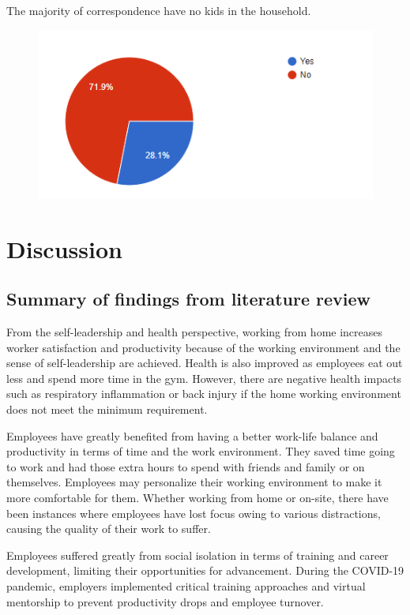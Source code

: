 \documentclass[12pt]{article}
\begin{document}
The majority of correspondence have no kids in the household.
\begin{figure}[h]
    \centering
    \includegraphics[scale=1]{bias_kids.png}
    \label{bias_kids}
\end{figure} 

\section*{Discussion}
\subsection*{Summary of findings from literature review}

From the self-leadership and health perspective, working from home increases worker satisfaction and productivity because of the working environment and the sense of self-leadership are achieved. Health is also improved as employees eat out less and spend more time in the gym. However, there are negative health impacts such as respiratory inflammation or back injury if the home working environment does not meet the minimum requirement.

Employees have greatly benefited from having a better work-life balance and productivity in terms of time and the work environment. They saved time going to work and had those extra hours to spend with friends and family or on themselves. Employees may personalize their working environment to make it more comfortable for them. Whether working from home or on-site, there have been instances where employees have lost focus owing to various distractions, causing the quality of their work to suffer.
 
Employees suffered greatly from social isolation in terms of training and career development, limiting their opportunities for advancement. During the COVID-19 pandemic, employers implemented critical training approaches and virtual mentorship to prevent productivity drops and employee turnover.
\end{document}

